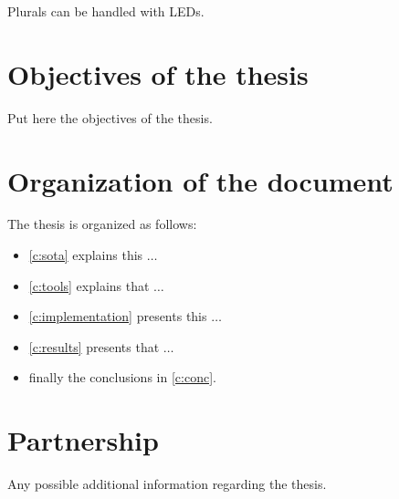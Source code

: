 Plurals can be handled with \acp{LED}.

\section{Objectives of the thesis}

%
%
Put here the objectives of the thesis.

\section{Organization of the document}

The thesis is organized as follows:

%
%
\begin{itemize}
\item \cref{c:sota} explains this $\ldots$
\item \cref{c:tools} explains that $\ldots$
\item \cref{c:implementation} presents this $\ldots$
\item \cref{c:results} presents that $\ldots$
\item finally the conclusions in \cref{c:conc}.
\end{itemize}

\section{Partnership}

Any possible additional information regarding the thesis.
